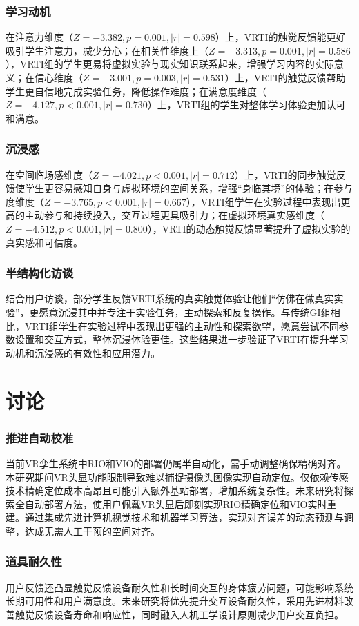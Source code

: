\documentclass[runningheads]{llncs}
\begin{document}
\subsubsection{学习动机}
在注意力维度（$Z=-3.382, p=0.001, |r|=0.598$）上，VRTI的触觉反馈能更好吸引学生注意力，减少分心；在相关性维度上（$Z=-3.313, p=0.001, |r|=0.586$），VRTI组的学生更易将虚拟实验与现实知识联系起来，增强学习内容的实际意义；在信心维度（$Z=-3.001, p=0.003, |r|=0.531$）上，VRTI的触觉反馈帮助学生更自信地完成实验任务，降低操作难度；在满意度维度（$Z=-4.127, p<0.001, |r|=0.730$）上，VRTI组的学生对整体学习体验更加认可和满意。

\subsubsection{沉浸感}
在空间临场感维度（$Z=-4.021, p<0.001, |r|=0.712$）上，VRTI的同步触觉反馈使学生更容易感知自身与虚拟环境的空间关系，增强“身临其境”的体验；在参与度维度（$Z=-3.765, p<0.001, |r|=0.667$），VRTI组学生在实验过程中表现出更高的主动参与和持续投入，交互过程更具吸引力；在虚拟环境真实感维度（$Z=-4.512, p<0.001, |r|=0.800$），VRTI的动态触觉反馈显著提升了虚拟实验的真实感和可信度。

\subsubsection{半结构化访谈}
结合用户访谈，部分学生反馈VRTI系统的真实触觉体验让他们“仿佛在做真实实验”，更愿意沉浸其中并专注于实验任务，主动探索和反复操作。与传统GI组相比，VRTI组学生在实验过程中表现出更强的主动性和探索欲望，愿意尝试不同参数设置和交互方式，整体沉浸体验更佳。这些结果进一步验证了VRTI在提升学习动机和沉浸感的有效性和应用潜力。

\section{讨论}
\subsubsection{推进自动校准}
当前VR孪生系统中RIO和VIO的部署仍属半自动化，需手动调整确保精确对齐。本研究期间VR头显功能限制导致难以捕捉摄像头图像实现自动定位。仅依赖传感技术精确定位成本高昂且可能引入额外基站部署，增加系统复杂性。未来研究将探索全自动部署方法，使用户佩戴VR头显后即刻实现RIO精确定位和VIO实时重建。通过集成先进计算机视觉技术和机器学习算法，实现对齐误差的动态预测与调整，达成无需人工干预的空间对齐。

\subsubsection{道具耐久性}
用户反馈还凸显触觉反馈设备耐久性和长时间交互的身体疲劳问题，可能影响系统长期可用性和用户满意度。未来研究将优先提升交互设备耐久性，采用先进材料改善触觉反馈设备寿命和响应性，同时融入人机工学设计原则减少用户交互负担。
\end{document}

